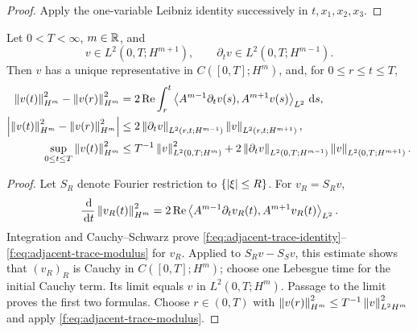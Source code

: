 \begin{proof}
Apply the one-variable Leibniz identity successively in \(t,x_1,x_2,x_3\).
\end{proof}

\begin{lemma}
\label{f:lem:adjacent-trace}
Let \(0<T<\infty\), \(m\in\mathbb R\), and
\[
 v\in L^2(0,T;H^{m+1}),
 \qquad
 \partial_tv\in L^2(0,T;H^{m-1}).
\]
Then \(v\) has a unique representative in \(C([0,T];H^m)\), and, for
\(0\le r\le t\le T\),
\begin{align}
 \left\lVert v(t)\right\rVert_{H^m}^2-\left\lVert v(r)\right\rVert_{H^m}^2
 &=2\operatorname{Re}\int_r^t
 \left\langle A^{m-1}\partial_tv(s),A^{m+1}v(s)\right\rangle_{L^2}\,\mathrm d s,
 \label{f:eq:adjacent-trace-identity}\\
 \left|\left\lVert v(t)\right\rVert_{H^m}^2-\left\lVert v(r)\right\rVert_{H^m}^2\right|
 &\le2\left\lVert \partial_tv\right\rVert_{L^2(r,t;H^{m-1})}
 \left\lVert v\right\rVert_{L^2(r,t;H^{m+1})},
 \label{f:eq:adjacent-trace-modulus}\\
 \sup_{0\le t\le T}\left\lVert v(t)\right\rVert_{H^m}^2
 &\le T^{-1}\left\lVert v\right\rVert_{L^2(0,T;H^m)}^2
 +2\left\lVert \partial_tv\right\rVert_{L^2(0,T;H^{m-1})}
 \left\lVert v\right\rVert_{L^2(0,T;H^{m+1})}.
 \label{f:eq:adjacent-trace-sup}
\end{align}
\end{lemma}

\begin{proof}
Let \(S_R\) denote Fourier restriction to \(\{\left|\xi\right|\le R\}\).  For
\(v_R=S_Rv\),
\[
 \frac{\,\mathrm d}{\,\mathrm d t}\left\lVert v_R(t)\right\rVert_{H^m}^2
 =2\operatorname{Re}\left\langle A^{m-1}\partial_tv_R(t),A^{m+1}v_R(t)\right\rangle_{L^2}.
\]
Integration and Cauchy--Schwarz prove
\eqref{f:eq:adjacent-trace-identity}--\eqref{f:eq:adjacent-trace-modulus} for
\(v_R\).  Applied to \(S_Rv-S_Sv\), this estimate shows that
\((v_R)_R\) is Cauchy in \(C([0,T];H^m)\); choose one Lebesgue time for the
initial Cauchy term.  Its limit equals \(v\) in
\(L^2(0,T;H^m)\).  Passage to the limit proves the first two formulas.
Choose \(r\in(0,T)\) with
\(\left\lVert v(r)\right\rVert_{H^m}^2\le T^{-1}\left\lVert v\right\rVert_{L^2H^m}^2\) and apply
\eqref{f:eq:adjacent-trace-modulus}.
\end{proof}

